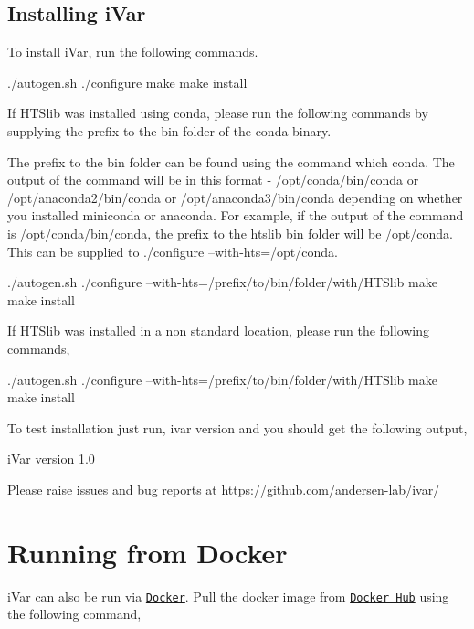 \hypertarget{installpage_autotoc_md9}{}\subsection{Installing i\+Var}\label{installpage_autotoc_md9}
To install i\+Var, run the following commands.


\begin{DoxyCode}
./autogen.sh
./configure
make
make install
\end{DoxyCode}


If H\+T\+Slib was installed using conda, please run the following commands by supplying the prefix to the bin folder of the conda binary.

The prefix to the bin folder can be found using the command {\ttfamily which conda}. The output of the command will be in this format -\/ /opt/conda/bin/conda or /opt/anaconda2/bin/conda or /opt/anaconda3/bin/conda depending on whether you installed miniconda or anaconda. For example, if the output of the command is /opt/conda/bin/conda, the prefix to the htslib bin folder will be /opt/conda. This can be supplied to ./configure --with-\/hts=/opt/conda.


\begin{DoxyCode}
./autogen.sh
./configure --with-hts=/prefix/to/bin/folder/with/HTSlib
make
make install
\end{DoxyCode}


If H\+T\+Slib was installed in a non standard location, please run the following commands,


\begin{DoxyCode}
./autogen.sh
./configure --with-hts=/prefix/to/bin/folder/with/HTSlib
make
make install
\end{DoxyCode}


To test installation just run, {\ttfamily ivar version} and you should get the following output,


\begin{DoxyCode}
iVar version 1.0

Please raise issues and bug reports at https://github.com/andersen-lab/ivar/
\end{DoxyCode}
\hypertarget{installpage_autotoc_md10}{}\section{Running from Docker}\label{installpage_autotoc_md10}
i\+Var can also be run via \href{https://www.docker.com/}{\tt Docker}. Pull the docker image from \href{https://hub.docker.com/}{\tt Docker Hub} using the following command,



